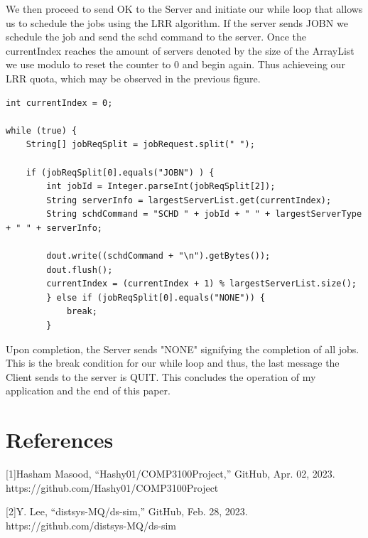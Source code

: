 \documentclass{article}
\begin{document}
We then proceed to send OK to the Server and initiate our while loop that allows us to schedule the jobs using the LRR algorithm. If the server sends JOBN we schedule the job and send the schd command to the server. Once the currentIndex reaches the amount of servers denoted by the size of the ArrayList we use modulo to reset the counter to 0 and begin again. Thus achieveing our LRR quota, which may be observed in the previous figure.
\begin{lstlisting}
int currentIndex = 0;

while (true) {
    String[] jobReqSplit = jobRequest.split(" ");
    
    if (jobReqSplit[0].equals("JOBN") ) {
        int jobId = Integer.parseInt(jobReqSplit[2]);
        String serverInfo = largestServerList.get(currentIndex);
        String schdCommand = "SCHD " + jobId + " " + largestServerType + " " + serverInfo;
    
        dout.write((schdCommand + "\n").getBytes());
        dout.flush();
        currentIndex = (currentIndex + 1) % largestServerList.size();
        } else if (jobReqSplit[0].equals("NONE")) {
            break;
        }
\end{lstlisting}
Upon completion, the Server sends "NONE" signifying the completion of all jobs. This is the break condition for our while loop and thus, the last message the Client sends to the server is QUIT. This concludes the operation of my application and the end of this paper. 

\section{References }
[1]Hasham Masood, “Hashy01/COMP3100Project,” GitHub, Apr. 02, 2023. https://github.com/Hashy01/COMP3100Project 

[2]Y. Lee, “distsys-MQ/ds-sim,” GitHub, Feb. 28, 2023. https://github.com/distsys-MQ/ds-sim
\end{document}
